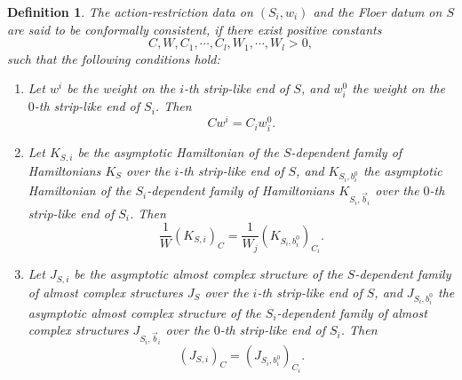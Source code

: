 \documentclass{amsart}
\newtheorem{definition}[theorem]{Definition}
\numberwithin{equation}{section}
\numberwithin{figure}{section}
\begin{document}
\begin{definition}
	The action-restriction data on $(S_{i}, w_{i})$ and the Floer datum on $S$ are said to be conformally consistent, if there exist positive constants 
\begin{equation*}
C, W, C_{1}, \cdots, C_{l}, W_{1}, \cdots, W_{l} > 0,
\end{equation*}
such that the following conditions hold:
\begin{enumerate}[label=(\roman*)]

\item Let $w^{i}$ be the weight on the $i$-th strip-like end of $S$, and $w_{i}^{0}$ the weight on the $0$-th strip-like end of $S_{i}$. Then
\begin{equation}
C w^{i} = C_{i} w_{i}^{0}.
\end{equation}

\item Let $K_{S, i}$ be the asymptotic Hamiltonian of the $S$-dependent family of Hamiltonians $K_{S}$ over the $i$-th strip-like end of $S$, and $K_{S_{i}, b_{i}^{0}}$ the asymptotic Hamiltonian of the $S_{i}$-dependent family of Hamiltonians $K_{S_{i}, \vec{b}_{i}}$ over the $0$-th strip-like end of $S_{i}$. Then
\begin{equation}
\frac{1}{W}(K_{S, i})_{C} = \frac{1}{W_{j}}(K_{S_{i}, b_{i}^{0}})_{C_{i}}.
\end{equation}

\item Let $J_{S, i}$ be the asymptotic almost complex structure of the $S$-dependent family of almost complex structures $J_{S}$ over the $i$-th strip-like end of $S$, and $J_{S_{i}, b_{i}^{0}}$ the asymptotic almost complex structure of the $S_{i}$-dependent family of almost complex structures $J_{S_{i}, \vec{b}_{i}}$ over the $0$-th strip-like end of $S_{i}$. Then
\begin{equation}
(J_{S, i})_{C} = (J_{S_{i}, b_{i}^{0}})_{C_{i}}.
\end{equation}

\end{enumerate} 

\end{definition}
\end{document}
